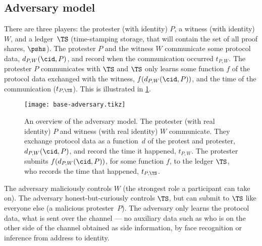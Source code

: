 \subsection{Adversary model}%
\label{formal-adversary-model}

There are three players: the protester (with identity) \(P\), a witness (with 
identity) \(W\), and a ledger~\(\TS\) (\ie time-stamping storage, that will 
contain the set of all proof shares, \(\pshs\)).
The protester \(P\) and the witness \(W\) communicate some protocol data,
\(d_{P,W}(\cid, P)\), and record when the communication occurred \(t_{P,W}\).
The protester \(P\) communicates with \(\TS\) and \(\TS\) only learns 
some function \(f\) of the protocol data exchanged with the witness,
\(f(d_{P,W}(\cid, P))\), and the time of the 
communication (\(t_{P,\TS}\)).
This is illustrated in \cref{fig:base-adversary}.

\begin{figure}
  \centering
  \texttt{[image: base-adversary.tikz]}
  \caption{\label{fig:base-adversary}%
    An overview of the adversary model.
    The protester (with real identity) \(P\) and witness (with real identity) 
    \(W\) communicate.
    They exchange protocol data as a function~\(d\) of the protest and 
    protester, \(d_{P,W}(\cid, P)\), and record the time it happened, 
    \(t_{P,W}\).
    The protester submits \(f(d_{P,W}(\cid, P))\), for some function \(f\), to 
    the ledger \(\TS\), who records the time that happened, \(t_{P,\TS}\).
  }
\end{figure}

The adversary maliciously controls \(W\) (the strongest role a
participant can take on).
The adversary honest-but-curiously controls \(\TS\), but can submit to \(\TS\) 
like everyone else (\ie a malicious protester~\(P\)).
The adversary only learns the protocol data, \ie what is sent over the 
channel --- no auxiliary data such as who is on the other side of the channel obtained
  as side information, \eg by face recognition or inference from address
  to identity.


